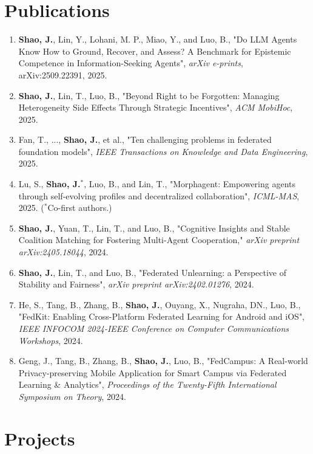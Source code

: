 \documentclass[10pt,a4paper]{article}
\begin{document}
\section*{\color{sectioncolor}Publications}
\begin{enumerate}[label=\textcolor{accentcolor}{\arabic*.}, leftmargin=*, itemsep=0.6em]
    \item \textbf{Shao, J.}, Lin, Y., Lohani, M. P., Miao, Y., and Luo, B., "Do LLM Agents Know How to Ground, Recover, and Assess? A Benchmark for Epistemic Competence in Information-Seeking Agents", \textit{arXiv e-prints}, arXiv:2509.22391, 2025.
    \item \textbf{Shao, J.}, Lin, T., Luo, B., "Beyond Right to be Forgotten: Managing Heterogeneity Side Effects Through Strategic Incentives", \textit{ACM MobiHoc}, 2025.
    \item Fan, T., ..., \textbf{Shao, J.}, et al., "Ten challenging problems in federated foundation models", \textit{IEEE Transactions on Knowledge and Data Engineering}, 2025.
    \item Lu, S., \textbf{Shao, J.}$^{*}$, Luo, B., and Lin, T., "Morphagent: Empowering agents through self-evolving profiles and decentralized collaboration", \textit{ICML-MAS}, 2025. ($^{*}$Co-first authors.)
    \item \textbf{Shao, J.}, Yuan, T., Lin, T., and Luo, B., "Cognitive Insights and Stable Coalition Matching for Fostering Multi-Agent Cooperation," \textit{arXiv preprint arXiv:2405.18044}, 2024.
    \item \textbf{Shao, J.}, Lin, T., and Luo, B., "Federated Unlearning: a Perspective of Stability and Fairness", \textit{arXiv preprint arXiv:2402.01276}, 2024.
    \item He, S., Tang, B., Zhang, B., \textbf{Shao, J.}, Ouyang, X., Nugraha, DN., Luo, B., "FedKit: Enabling Cross-Platform Federated Learning for Android and iOS", \textit{IEEE INFOCOM 2024-IEEE Conference on Computer Communications Workshops}, 2024.
    \item Geng, J., Tang, B., Zhang, B., \textbf{Shao, J.}, Luo, B., "FedCampus: A Real-world Privacy-preserving Mobile Application for Smart Campus via Federated Learning \& Analytics", \textit{Proceedings of the Twenty-Fifth International Symposium on Theory}, 2024.


\end{enumerate}
\vspace{0.5em}

\section*{\color{sectioncolor}Projects}
\end{document}
